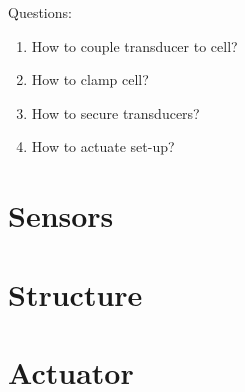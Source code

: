 Questions:
\begin{enumerate}
	\item How to couple transducer to cell?
	\item How to clamp cell?
	\item How to secure transducers?
    \item How to actuate set-up?
\end{enumerate}

\section{Sensors}

\section{Structure}

\section{Actuator}